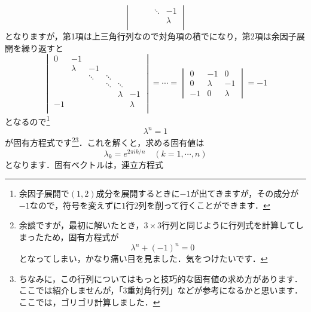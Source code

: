 \documentclass[a4paper,pdflatex,ja=standard]{bxjsarticle}
\begin{document}
\begin{enumerate}
\begin{enumerate}
\begin{equation}
\begin{vmatrix}
          &   &        &  \ddots  & -1 \\
          &   &        &          & \lambda   \\       
      \end{vmatrix}
    \end{equation}
    となりますが，第1項は上三角行列なので対角項の積でになり，第2項は余因子展開を繰り返すと
    \begin{equation}    
      \begin{vmatrix}
        0 & -1 &   &   &   &     \\
          & \lambda & -1 &   &   &     \\
          &   & \ddots &  \ddots  &  &     \\
          &   &        &  \ddots  & \ddots &    \\
          &   &        &          & \lambda & -1  \\        
        -1 &   &        &          &       & \lambda \\
      \end{vmatrix}
      =
      \cdots
      =
      \begin{vmatrix}
        0 & -1 & 0 \\
        0 & \lambda & -1 \\
        -1 & 0 & \lambda
      \end{vmatrix}
      =
      -1
    \end{equation}
    となるので\footnote{
      余因子展開で$(1,2)$成分を展開するときに$-1$が出てきますが，その成分が$-1$なので，符号を変えずに$1$行$2$列を削って行くことができます．
    }
    \begin{equation}
      \lambda^n
      =
      1
    \end{equation}
    が固有方程式です\footnote{
      余談ですが，最初に解いたとき，$3\times 3$行列と同じように行列式を計算してしまったため，固有方程式が
      $$
        \lambda^n
        +
        (-1)^n
        =
        0
      $$
      となってしまい，かなり痛い目を見ました．気をつけたいです．
    }\footnote{
      ちなみに，この行列についてはもっと技巧的な固有値の求め方があります．ここでは紹介しませんが，「3重対角行列」などが参考になるかと思います．ここでは，ゴリゴリ計算しました．
    }．これを解くと，求める固有値は
    \begin{equation}
      \lambda_k
      =
      e^{2\pi i k/n}
      \quad
      (k=1,\cdots,n)
    \end{equation}
    となります．固有ベクトルは，連立方程式
    \begin{equation}    

\end{equation}
\end{enumerate}
\end{enumerate}
\end{document}
